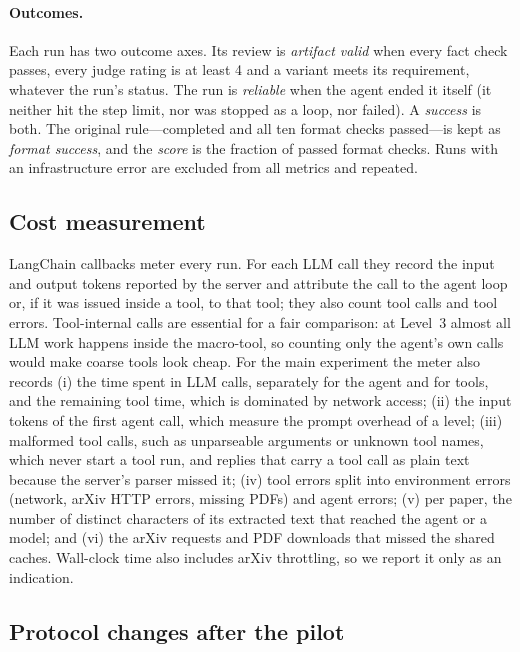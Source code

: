 \paragraph{Outcomes.} Each run has two outcome axes. Its review is \emph{artifact valid} when every fact check passes, every judge rating is at least 4 and a variant meets its requirement, whatever the run's status. The run is \emph{reliable} when the agent ended it itself (it neither hit the step limit, nor was stopped as a loop, nor failed). A \emph{success} is both. The original rule---completed and all ten format checks passed---is kept as \emph{format success}, and the \emph{score} is the fraction of passed format checks. Runs with an infrastructure error are excluded from all metrics and repeated.

\subsection{Cost measurement}
\label{sec:cost}

LangChain callbacks meter every run. For each LLM call they record the input and output tokens reported by the server and attribute the call to the agent loop or, if it was issued inside a tool, to that tool; they also count tool calls and tool errors. Tool-internal calls are essential for a fair comparison: at Level~3 almost all LLM work happens inside the macro-tool, so counting only the agent's own calls would make coarse tools look cheap. For the main experiment the meter also records (i) the time spent in LLM calls, separately for the agent and for tools, and the remaining tool time, which is dominated by network access; (ii) the input tokens of the first agent call, which measure the prompt overhead of a level; (iii) malformed tool calls, such as unparseable arguments or unknown tool names, which never start a tool run, and replies that carry a tool call as plain text because the server's parser missed it; (iv) tool errors split into environment errors (network, arXiv HTTP errors, missing PDFs) and agent errors; (v) per paper, the number of distinct characters of its extracted text that reached the agent or a model; and (vi) the arXiv requests and PDF downloads that missed the shared caches. Wall-clock time also includes arXiv throttling, so we report it only as an indication.

\subsection{Protocol changes after the pilot}
\label{sec:protocol-changes}

